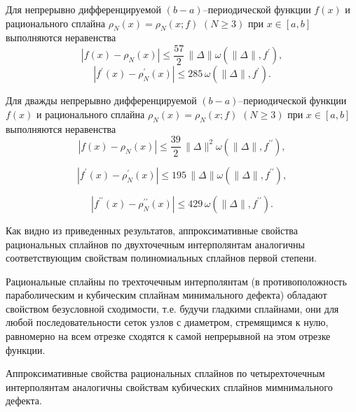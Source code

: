 \begin{theorem}\label{teor3.2}
Для непрерывно дифференцируемой $(b-a)$--периодической функции $f(x)$ и
 рационального сплайна $\rho_N(x)=\rho_N(x;f)$ $(N\geqslant 3)$ при $x\in[a,b]$ выполняются
неравенства
\begin{equation*}
|f(x)-\rho_N(x)|\leqslant \frac{57}2\, \|\Delta\| \omega(\|\Delta\|, f^\prime),
\end{equation*}
\begin{equation*}
|f^\prime(x)-\rho^\prime_N(x)|\leqslant 285 \,\omega(\|\Delta\|, f^\prime).
\end{equation*}
\end{theorem}

\begin{theorem}\label{teor3.3}
Для дважды непрерывно дифференцируемой $(b-a)$--периодической функции $f(x)$ и
 рационального сплайна $\rho_N(x)=\rho_N(x;f)$ $(N\geqslant 3)$ при $x\in[a,b]$ выполняются
неравенства
\begin{equation*}
|f(x)-\rho_N(x)|\leqslant \frac{39}2\, \|\Delta\|^2 \omega(\|\Delta\|, f^{\prime\prime}),
\end{equation*}

\begin{equation*}
|f^\prime(x)-\rho^\prime_N(x)|\leqslant 195\, \|\Delta\| \omega(\|\Delta\|, f^{\prime\prime}),
\end{equation*}

\begin{equation*}
|f^{\prime\prime}(x)-\rho^{\prime\prime}_N(x)|\leqslant 429 \,\omega(\|\Delta\|, f^{\prime\prime}).
\end{equation*}
\end{theorem}

Как видно из приведенных результатов, аппроксимативные свойства рациональных
 сплайнов по двухточечным интерполянтам аналогичны соответствующим свойствам полиномиальных сплайнов
первой степени.

Рациональные сплайны по трехточечным интерполянтам (в противоположность параболическим и кубическим сплайнам
минимального дефекта) обладают свойством безусловной сходимости, т.е. будучи гладкими сплайнами,
они для любой последовательности сеток узлов с диаметром, стремящимся к нулю, равномерно на всем отрезке
сходятся к самой непрерывной на этом отрезке функции.

Аппроксимативные свойства рациональных сплайнов по четырехточечным интерполянтам аналогичны свойствам
кубических сплайнов мимнимального дефекта.

